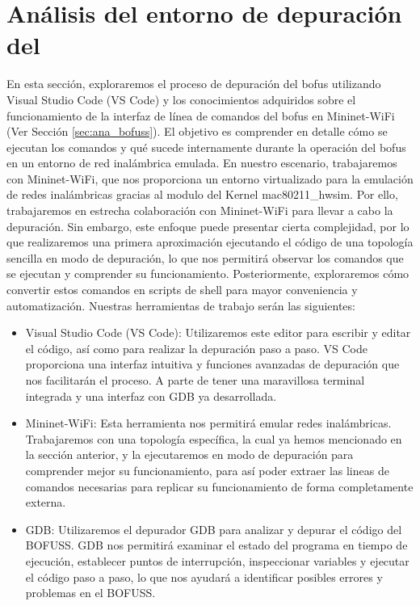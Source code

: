 \section{Análisis del entorno de depuración del }
\label{sec:ana_gdb}

En esta sección, exploraremos el proceso de depuración del \gls{bofus} utilizando Visual Studio Code (VS Code) y los conocimientos adquiridos sobre el funcionamiento de la interfaz de línea de comandos  del \gls{bofus} en Mininet-WiFi (Ver Sección \ref{sec:ana_bofuss}). El objetivo es comprender en detalle cómo se ejecutan los comandos y qué sucede internamente durante la operación del \gls{bofus} en un entorno de red inalámbrica emulada. En nuestro escenario, trabajaremos con Mininet-WiFi, que nos proporciona un entorno virtualizado para la emulación de redes inalámbricas gracias al modulo del Kernel mac80211\_hwsim. Por ello, trabajaremos en estrecha colaboración con Mininet-WiFi para llevar a cabo la depuración. Sin embargo, este enfoque puede presentar cierta complejidad, por lo que realizaremos una primera aproximación ejecutando el código de una topología sencilla en modo de depuración, lo que nos permitirá observar los comandos que se ejecutan y comprender su funcionamiento. Posteriormente, exploraremos cómo convertir estos comandos en scripts de shell para mayor conveniencia y automatización. Nuestras herramientas de trabajo serán las siguientes:\\

\begin{itemize}
    \item Visual Studio Code (VS Code): Utilizaremos este editor para escribir y editar el código, así como para realizar la depuración paso a paso. VS Code proporciona una interfaz intuitiva y funciones avanzadas de depuración que nos facilitarán el proceso. A parte de tener una maravillosa terminal integrada y una interfaz con GDB ya desarrollada.

    \item Mininet-WiFi: Esta herramienta nos permitirá emular redes inalámbricas. Trabajaremos con una topología específica, la cual ya hemos mencionado en la sección anterior, y la ejecutaremos en modo de depuración para comprender mejor su funcionamiento, para así poder extraer las lineas de comandos necesarias para replicar su funcionamiento de forma completamente externa.

    \item GDB: Utilizaremos el depurador GDB para analizar y depurar el código del BOFUSS. GDB nos permitirá examinar el estado del programa en tiempo de ejecución, establecer puntos de interrupción, inspeccionar variables y ejecutar el código paso a paso, lo que nos ayudará a identificar posibles errores y problemas en el BOFUSS.
\end{itemize}

